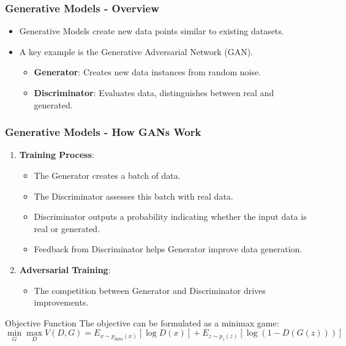 \documentclass{beamer}
\begin{document}
\begin{frame}[fragile]
    \frametitle{Generative Models - Overview}
    \begin{itemize}
        \item Generative Models create new data points similar to existing datasets.
        \item A key example is the Generative Adversarial Network (GAN).
        \begin{itemize}
            \item \textbf{Generator}: Creates new data instances from random noise.
            \item \textbf{Discriminator}: Evaluates data, distinguishes between real and generated.
        \end{itemize}
    \end{itemize}
\end{frame}

\begin{frame}[fragile]
    \frametitle{Generative Models - How GANs Work}
    \begin{enumerate}
        \item \textbf{Training Process}:
            \begin{itemize}
                \item The Generator creates a batch of data.
                \item The Discriminator assesses this batch with real data.
                \item Discriminator outputs a probability indicating whether the input data is real or generated.
                \item Feedback from Discriminator helps Generator improve data generation.
            \end{itemize}
        \item \textbf{Adversarial Training}: 
            \begin{itemize}
                \item The competition between Generator and Discriminator drives improvements.
            \end{itemize}
    \end{enumerate}
    \begin{block}{Objective Function}
        The objective can be formulated as a minimax game:
        \begin{equation}
            \min_G \max_D V(D, G) = E_{x \sim p_{data}(x)}[\log D(x)] + E_{z \sim p_z(z)}[\log(1 - D(G(z)))]
        \end{equation}
    \end{block}
\end{frame}
\end{document}
